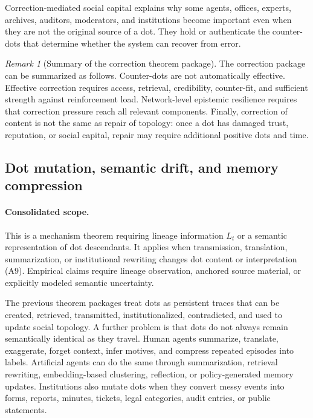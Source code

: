 \documentclass[11pt]{article}
\theoremstyle{remark}
\newtheorem{remark}{Remark}
\begin{document}
Correction-mediated social capital explains why some agents, offices,
experts, archives, auditors, moderators, and institutions become
important even when they are not the original source of a dot. They hold
or authenticate the counter-dots that determine whether the system can
recover from error.

\begin{remark}[Summary of the correction theorem package]
The correction package can be summarized as follows. Counter-dots are not
automatically effective. Effective correction requires access, retrieval,
credibility, counter-fit, and sufficient strength against reinforcement
load. Network-level epistemic resilience requires that correction
pressure reach all relevant components. Finally, correction of content is
not the same as repair of topology: once a dot has damaged trust,
reputation, or social capital, repair may require additional positive
dots and time.
\end{remark}

\subsection{Dot mutation, semantic drift, and memory compression}\label{dot-mutation-semantic-drift-and-memory-compression}

\paragraph{Consolidated scope.} This is a mechanism theorem requiring lineage information $L_t$ or a semantic representation of dot descendants. It applies when transmission, translation, summarization, or institutional rewriting changes dot content or interpretation (A9). Empirical claims require lineage observation, anchored source material, or explicitly modeled semantic uncertainty.

The previous theorem packages treat dots as persistent traces that can be
created, retrieved, transmitted, institutionalized, contradicted, and
used to update social topology. A further problem is that dots do not
always remain semantically identical as they travel. Human agents
summarize, translate, exaggerate, forget context, infer motives, and
compress repeated episodes into labels. Artificial agents can do the
same through summarization, retrieval rewriting, embedding-based
clustering, reflection, or policy-generated memory updates. Institutions
also mutate dots when they convert messy events into forms, reports,
minutes, tickets, legal categories, audit entries, or public statements.
\end{document}
